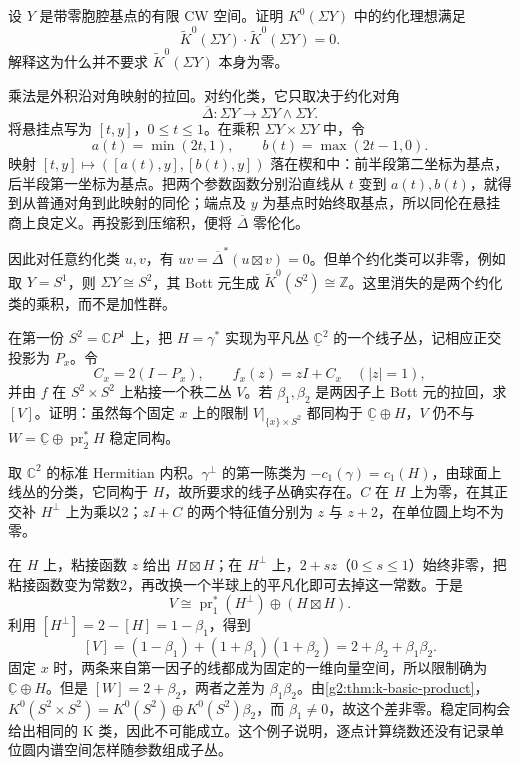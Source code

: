 \begin{exercise}\label{g2:ex:k-suspension-square-zero}
	设 \(Y\) 是带零胞腔基点的有限 CW 空间。证明 \(K^0(\Sigma Y)\) 中的约化理想满足
	\[
		\widetilde K^0(\Sigma Y)\cdot\widetilde K^0(\Sigma Y)=0.
	\]
	解释这为什么并不要求 \(\widetilde K^0(\Sigma Y)\) 本身为零。
\end{exercise}
\begin{solution}
	乘法是外积沿对角映射的拉回。对约化类，它只取决于约化对角
	\[
		\overline\Delta:\Sigma Y\longrightarrow\Sigma Y\wedge\Sigma Y.
	\]
	将悬挂点写为 \([t,y]\)，\(0\le t\le1\)。在乘积 \(\Sigma Y\times\Sigma Y\) 中，令
	\[
		a(t)=\min(2t,1),\qquad b(t)=\max(2t-1,0).
	\]
	映射 \([t,y]\mapsto([a(t),y],[b(t),y])\) 落在楔和中：前半段第二坐标为基点，后半段第一坐标为基点。把两个参数函数分别沿直线从 \(t\) 变到 \(a(t),b(t)\)，就得到从普通对角到此映射的同伦；端点及 \(y\) 为基点时始终取基点，所以同伦在悬挂商上良定义。再投影到压缩积，便将 \(\overline\Delta\) 零伦化。

	因此对任意约化类 \(u,v\)，有 \(uv=\overline\Delta^*(u\boxtimes v)=0\)。但单个约化类可以非零，例如取 \(Y=S^1\)，则 \(\Sigma Y\cong S^2\)，其 Bott 元生成 \(\widetilde K^0(S^2)\cong\mathbb Z\)。这里消失的是两个约化类的乘积，而不是加性群。
\end{solution}

\begin{exercise}\label{g2:ex:k-family-spectral-bundle}
	在第一份 \(S^2=\mathbb CP^1\) 上，把 \(H=\gamma^*\) 实现为平凡丛 \(\underline{\mathbb C}^2\) 的一个线子丛，记相应正交投影为 \(P_x\)。令
	\[
		C_x=2(I-P_x),\qquad f_x(z)=zI+C_x\quad(|z|=1),
	\]
	并由 \(f\) 在 \(S^2\times S^2\) 上粘接一个秩二丛 \(V\)。若 \(\beta_1,\beta_2\) 是两因子上 Bott 元的拉回，求 \([V]\)。证明：虽然每个固定 \(x\) 上的限制 \(V|_{\{x\}\times S^2}\) 都同构于 \(\underline{\mathbb C}\oplus H\)，\(V\) 仍不与 \(W=\underline{\mathbb C}\oplus\operatorname{pr}_2^*H\) 稳定同构。
\end{exercise}
\begin{solution}
	取 \(\mathbb C^2\) 的标准 Hermitian 内积。\(\gamma^\perp\) 的第一陈类为 \(-c_1(\gamma)=c_1(H)\)，由球面上线丛的分类，它同构于 \(H\)，故所要求的线子丛确实存在。\(C\) 在 \(H\) 上为零，在其正交补 \(H^\perp\) 上为乘以2；\(zI+C\) 的两个特征值分别为 \(z\) 与 \(z+2\)，在单位圆上均不为零。

	在 \(H\) 上，粘接函数 \(z\) 给出 \(H\boxtimes H\)；在 \(H^\perp\) 上，\(2+sz\)（\(0\le s\le1\)）始终非零，把粘接函数变为常数2，再改换一个半球上的平凡化即可去掉这一常数。于是
	\[
		V\cong\operatorname{pr}_1^*(H^\perp)\oplus(H\boxtimes H).
	\]
	利用 \([H^\perp]=2-[H]=1-\beta_1\)，得到
	\[
		[V]=(1-\beta_1)+(1+\beta_1)(1+\beta_2)
		=2+\beta_2+\beta_1\beta_2.
	\]
	固定 \(x\) 时，两条来自第一因子的线都成为固定的一维向量空间，所以限制确为 \(\underline{\mathbb C}\oplus H\)。但是 \([W]=2+\beta_2\)，两者之差为 \(\beta_1\beta_2\)。由\cref{g2:thm:k-basic-product}，\(K^0(S^2\times S^2)=K^0(S^2)\oplus K^0(S^2)\beta_2\)，而 \(\beta_1\ne0\)，故这个差非零。稳定同构会给出相同的 K 类，因此不可能成立。这个例子说明，逐点计算绕数还没有记录单位圆内谱空间怎样随参数组成子丛。
\end{solution}

